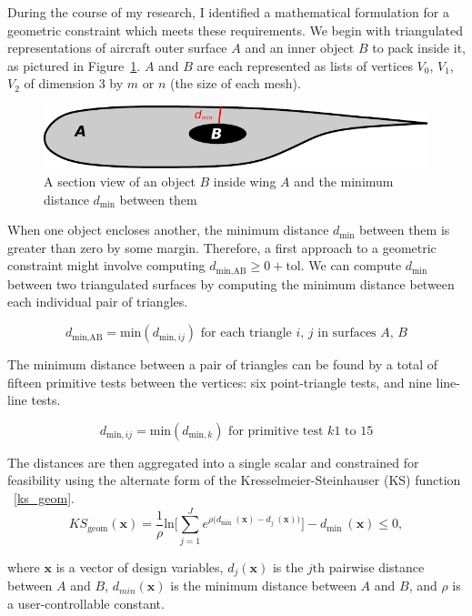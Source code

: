 \documentclass[11pt,letterpaper]{article}
\begin{document}
\qquad During the course of my research, I identified a mathematical formulation for a geometric constraint which meets these requirements.
We begin with triangulated representations of aircraft outer surface $A$ and an inner object $B$ to pack inside it, as pictured in Figure~\ref{fig:schematic}. 
$A$ and $B$ are each represented as lists of vertices $V_0$, $V_1$, $V_2$ of dimension 3 by $m$ or $n$ (the size of each mesh).

\begin{figure}[ht]
  \centering
  \includegraphics[width=0.45\linewidth]{figures/schematic}
  \caption{A section view of an object $B$ inside wing $A$ and the minimum distance $d_\text{min}$ between them}
  \label{fig:schematic}
\end{figure}

When one object encloses another, the minimum distance $d_\text{min}$ between them is greater than zero by some margin.
Therefore, a first approach to a geometric constraint might involve computing $d_\text{min,AB} \geq 0 + \text{tol}$.
We can compute $d_\text{min}$ between two triangulated surfaces by computing the minimum distance between each individual pair of triangles.

\begin{equation}
  \label{eq:dmin}
  d_\text{min,AB} = \text{min}(d_{\text{min},ij}) \text{ for each triangle } i, \, j \text{ in surfaces } A, \, B
\end{equation}

The minimum distance between a pair of triangles can be found by a total of fifteen primitive tests between the vertices: six point-triangle tests, and nine line-line tests. %

\begin{equation}
  d_{\text{min},ij} = \text{min}(d_{\text{min},k}) \text{ for primitive test }k\text{1 to 15}
\end{equation}

The distances are then aggregated into a single scalar and constrained for feasibility using the alternate form of the Kresselmeier-Steinhauser (KS) function ~\ref{ks_geom}.
\begin{equation}
  \label{ks_geom}
  KS_\text{geom}(\textbf{x}) = \frac{1}{\rho} \textrm{ln} \Bigg[\sum_{j=1}^{J} e^{\rho\big(d_\text{min}\:(\textbf{x})-d_j\:(\textbf{x})\big)}\Bigg] - d_\text{min}\:(\textbf{x}) \leq 0 ,
\end{equation}

where $\textbf{x}$ is a vector of design variables,
$d_j(\textbf{x})$ is the $j\textrm{th}$ pairwise distance between $A$ and $B$,
$d_{min}(\textbf{x})$ is the minimum distance between $A$ and $B$, and
$\rho$ is a user-controllable constant.
\end{document}
